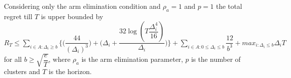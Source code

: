 



\begin{proposition}
\label{Result:Prop:1}
Considering only the arm elimination condition and $\rho_{a}=1$ and $p=1$ the total regret till $T$ is upper bounded by $R_{T}\leq \sum_{i\in A:\Delta_{i}\geq b}\bigg \lbrace \bigg(\dfrac{44}{(\Delta_{i})^{3}}\bigg) + \bigg(\Delta_{i}+\dfrac{32\log{(T\dfrac{\Delta_{i}^{4}}{16})}}{\Delta_{i}}\bigg)\bigg\rbrace + \sum_{i\in A:0\leq\Delta_{i}\leq b}\dfrac{12}{b^{3}} + max_{i:\Delta_{i}\leq b}\Delta_{i}T$ for all $b\geq\sqrt{\dfrac{e}{T}}$, where $\rho_{a}$ is the arm elimination parameter, $p$ is the number of clusters and $T$ is the horizon.
\end{proposition}

